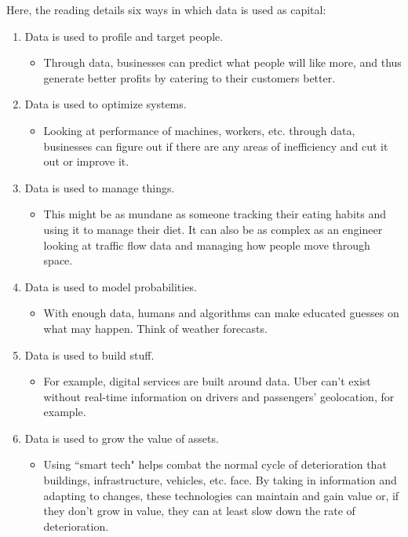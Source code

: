 \documentclass[openany]{book}
\begin{document}
Here, the reading details six ways in which data is used as capital:
\begin{enumerate}
	\item Data is used to profile and target people.
	\begin{itemize}
		\item Through data, businesses can predict what people will like more, and thus generate better profits by catering to their customers better.
	\end{itemize}
	\item Data is used to optimize systems.
	\begin{itemize}
		\item Looking at performance of machines, workers, etc. through data, businesses can figure out if there are any areas of inefficiency and cut it out or improve it.
	\end{itemize}
	\item Data is used to manage things.
	\begin{itemize}
		\item This might be as mundane as someone tracking their eating habits and using it to manage their diet. It can also be as complex as an engineer looking at traffic flow data and managing how people move through space.
	\end{itemize}
	\item Data is used to model probabilities.
	\begin{itemize}
		\item With enough data, humans and algorithms can make educated guesses on what may happen. Think of weather forecasts.
	\end{itemize}
	\item Data is used to build stuff.
	\begin{itemize}
		\item For example, digital services are built around data. Uber can't exist without real-time information on drivers and passengers' geolocation, for example.
	\end{itemize}
	\item Data is used to grow the value of assets.
	\begin{itemize}
		\item Using ``smart tech" helps combat the normal cycle of deterioration that buildings, infrastructure, vehicles, etc. face. By taking in information and adapting to changes, these technologies can maintain and gain value or, if they don't grow in value, they can at least slow down the rate of deterioration.
	\end{itemize}
\end{enumerate}
\end{document}
